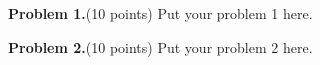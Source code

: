 \documentclass[12pt]{article}
\begin{document}
\bigskip

\bigskip

{\bf Problem 1.}(10 points) 
Put your problem 1 here.



\newpage

{\bf Problem 2.}(10 points)
Put your problem 2 here.
\end{document}
